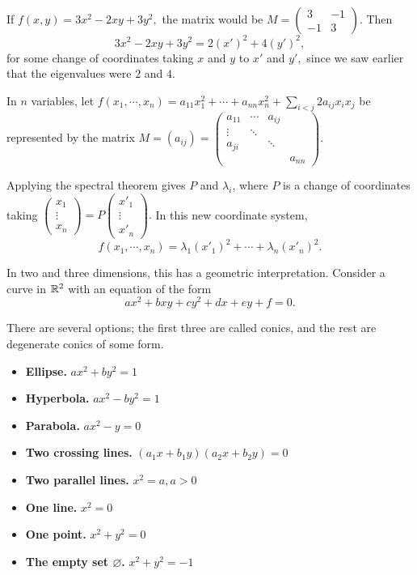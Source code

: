 \begin{example}

If $f(x, y) = 3x^2 - 2xy + 3y^2,$ the matrix would be $M = \begin{pmatrix}
3 & -1 \\ -1 & 3
\end{pmatrix}$. Then 
\[
3x^2 - 2xy + 3y^2 = 2(x')^2 + 4(y')^2,
\]
for some change of coordinates taking $x$ and $y$ to  $x'$ and $y',$ since we saw earlier that the eigenvalues were $2$ and $4.$ 

\end{example}

In $n$ variables, let $f(x_1, \cdots, x_n) = a_{11} x_1^2 + \cdots + a_{nn}x_n^2 + \sum_{i < j} 2a_{ij}x_ix_j$ be represented by the matrix $M = (a_{ij}) = \begin{pmatrix}
a_{11} & \cdots & a_{ij} & \\
\vdots & \ddots & & \\
a_{ji} & & \ddots& \\
& & & a_{nn}
\end{pmatrix}.$ %

Applying the spectral theorem gives $P$ and $\lambda_i$, where $P$ is a change of coordinates taking $\begin{pmatrix}
x_1 \\ \vdots \\ x_n
\end{pmatrix} = P\begin{pmatrix}
x'_1 \\ \vdots \\ x'_n
\end{pmatrix}.$ In this new coordinate system, 
\[
f(x_1, \cdots, x_n) = \lambda_1(x'_1)^2 + \cdots + \lambda_n(x'_n)^2.
\]

In two and three dimensions, this has a geometric interpretation. Consider a curve in $\mathbb R^2$ with an equation of the form
\[
ax^2 + bxy + cy^2 + dx + ey + f = 0.
\]

There are several options; the first three are called conics, and the rest are degenerate conics of some form.
\begin{itemize}
    \item \textbf{Ellipse.} $ax^2 + by^2 = 1$
    \item \textbf{Hyperbola.} $ax^2 - by^2 = 1$
    \item \textbf{Parabola.} $ax^2 - y = 0$
    \item \textbf{Two crossing lines.} $(a_1x + b_1y)(a_2x + b_2y) = 0$
    \item \textbf{Two parallel lines.} $x^2 = a, a > 0$
    \item \textbf{One line.} $x^2 = 0$ 
    \item \textbf{One point.} $x^2 + y^2 = 0$
    \item \textbf{The empty set $\varnothing$.} $x^2 + y^2 = -1$
\end{itemize}

